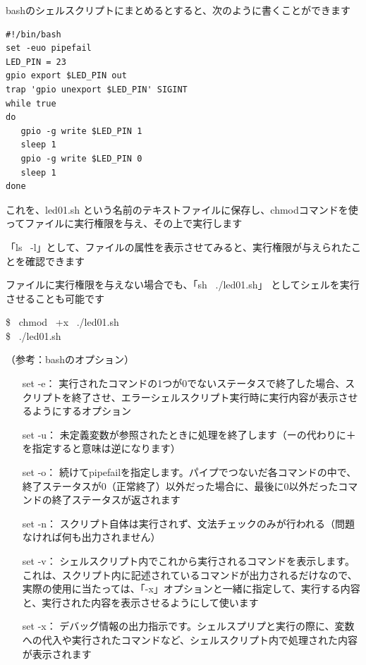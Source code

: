 \documentclass[uplatex,a4paper,11pt,oneside,openany]{jsbook}
\begin{document}
bashのシェルスクリプトにまとめるとすると、次のように書くことができます

\begin{lstlisting}[caption=LED(shell),label=prog1]
#!/bin/bash
set -euo pipefail
LED_PIN = 23
gpio export $LED_PIN out
trap 'gpio unexport $LED_PIN' SIGINT
while true
do
   gpio -g write $LED_PIN 1
   sleep 1
   gpio -g write $LED_PIN 0
   sleep 1
done
\end{lstlisting}

これを、led01.sh という名前のテキストファイルに保存し、chmodコマンドを使ってファイルに実行権限を与え、その上で実行します

「ls \, -l」として、ファイルの属性を表示させてみると、実行権限が与えられたことを確認できます

ファイルに実行権限を与えない場合でも、「sh \, ./led01.sh」 としてシェルを実行させることも可能です

\begin{screen}
\$ \, chmod \, +x \, ./led01.sh\\
\$ \, ./led01.sh
\end{screen}

（参考：bashのオプション）
\begin{enumerate}
\item[set -e：] 実行されたコマンドの1つが0でないステータスで終了した場合、スクリプトを終了させ、エラーシェルスクリプト実行時に実行内容が表示させるようにするオプション
\item[set -u：] 未定義変数が参照されたときに処理を終了します（ーの代わりに＋を指定すると意味は逆になります）
\item[set -o：] 続けてpipefailを指定します。パイプでつないだ各コマンドの中で、終了ステータスが0（正常終了）以外だった場合に、最後に0以外だったコマンドの終了ステータスが返されます
\item[set -n：] スクリプト自体は実行されず、文法チェックのみが行われる（問題なければ何も出力されません）
\item[set -v：] シェルスクリプト内でこれから実行されるコマンドを表示します。これは、スクリプト内に記述されているコマンドが出力されるだけなので、実際の使用に当たっては、「-x」オプションと一緒に指定して、実行する内容と、実行された内容を表示させるようにして使います
\item[set -x：] デバッグ情報の出力指示です。シェルスプリプと実行の際に、変数への代入や実行されたコマンドなど、シェルスクリプト内で処理された内容が表示されます
\end{enumerate}

\end{document}
